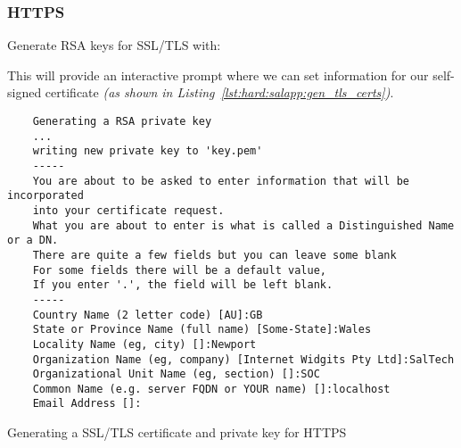 \subsubsection{HTTPS}
Generate RSA keys for SSL/TLS with:\\

\noindent This will provide an interactive prompt where we can set information for our self-signed certificate \textit{(as shown in Listing~\ref{lst:hard:salapp:gen_tls_certs})}.

\begin{listing}[H]
  \captionsetup{skip=\skiplistingcaptionlen}
  \begin{verbatim}
    Generating a RSA private key
    ...
    writing new private key to 'key.pem'
    -----
    You are about to be asked to enter information that will be incorporated
    into your certificate request.
    What you are about to enter is what is called a Distinguished Name or a DN.
    There are quite a few fields but you can leave some blank
    For some fields there will be a default value,
    If you enter '.', the field will be left blank.
    -----
    Country Name (2 letter code) [AU]:GB
    State or Province Name (full name) [Some-State]:Wales
    Locality Name (eg, city) []:Newport
    Organization Name (eg, company) [Internet Widgits Pty Ltd]:SalTech
    Organizational Unit Name (eg, section) []:SOC
    Common Name (e.g. server FQDN or YOUR name) []:localhost
    Email Address []:
  \end{verbatim}
  \caption{Generating a SSL/TLS certificate and private key for HTTPS}
  \label{lst:hard:salapp:gen_tls_certs}
\end{listing}

